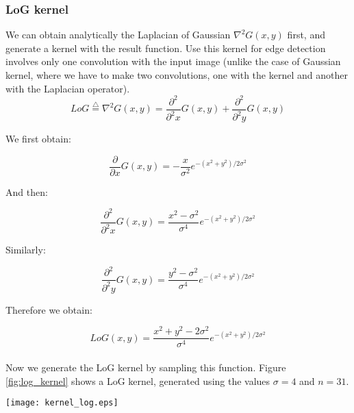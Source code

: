 \documentclass{ipol}
\numberwithin{equation}{section}
\numberwithin{table}{section}
\numberwithin{figure}{section}
\begin{document}
\subsubsection{LoG kernel}

We can obtain analytically the Laplacian of Gaussian $\nabla^2G(x,y)$ first, and generate a kernel 
with the result function. Use this kernel for edge detection involves only one convolution with 
the input image (unlike the case of Gaussian kernel, where we have to make two convolutions, one 
with the kernel and another with the Laplacian operator).\\

\begin{equation}
	LoG \stackrel{\triangle}{=}\nabla^2G(x,y)=\frac{\partial^2}{\partial^2 x}G(x,y) + \frac{\partial^2}{\partial^2 y}G(x,y)
\end{equation}

We first obtain:

\begin{equation} 
	\frac{\partial}{\partial x}G(x,y)=-\frac{x}{\sigma^2}e^{-(x^2+y^2)/2\sigma^2}
\end{equation}

And then:

\begin{equation} 
	\frac{\partial^2}{\partial^2 x}G(x,y)=\frac{x^2-\sigma^2}{\sigma^4}e^{-(x^2+y^2)/2\sigma^2} 
\end{equation}

Similarly:

\begin{equation} 
	\frac{\partial^2}{\partial^2 y}G(x,y)=\frac{y^2-\sigma^2}{\sigma^4}e^{-(x^2+y^2)/2\sigma^2} 
\end{equation}

Therefore we obtain:

\begin{equation}
	\label{eq:log_function}
	LoG(x,y)=\frac{x^2+y^2-2\sigma^2}{\sigma^4}e^{-(x^2+y^2)/2\sigma^2}
\end{equation}\\

Now we generate the LoG kernel by sampling this function. Figure \ref{fig:log_kernel} shows a LoG kernel, generated using the 
values $\sigma=4$ and $n=31$.\\

\begin{SCfigure}[][!t]
	\centering
	\texttt{[image: kernel\_log.eps]}
	\caption{Laplacian of a Gaussian kernel, $\sigma=4$, $n=31$. The selected value of n is sufficient 
to have a good approximation of the LoG function in the kernel, but is greater than in the case of 
Gaussian kernel.}
	\label{fig:log_kernel}
\end{SCfigure}
\end{document}
